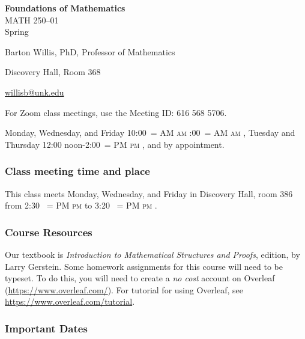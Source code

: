 \documentclass[12pt]{article}
\makeatletter
\newcounter{ex}\setcounter{ex}{0}
\renewenvironment{description}[0]{\begin{compactdesc}}{\end{compactdesc}}
\DeclareRobustCommand{\maybefakesc}[1]{%
  \ifnum\pdfstrcmp{\f@series}{\bfdefault}=\z@
    {\fontsize{\dimexpr0.8\dimexpr\f@size pt\relax}{0}\selectfont\uppercase{#1}}%
  \else
    \textsc{#1}%
  \fi
}
\newcommand\AM{\,\maybefakesc{am}\xspace}
\newcommand\PM{\,\maybefakesc{pm}\xspace}
\newcommand{\coursename}{Foundations of Mathematics}
\newcommand{\coursenumber}{MATH 250}
\newcommand{\sectionnumber}{01}
\newcommand{\term}{Spring }
\newcommand{\room}{Discovery Hall, room 386}
\newcommand{\meetingtime}{This class meets Monday, Wednesday, and Friday in \room \/  from 2:30 \PM to 3:20 \PM.}
\newcommand{\officehours}{Monday, Wednesday, and Friday 10:00\AM-11:00\AM,
    Tuesday and Thursday 12:00 noon-2:00\PM, and by appointment.}
\makeatother
\begin{document}
\cleanlookdateon%
\shortdate
\printyearoff
\large
\begin{center}
    \textbf{\coursename}  \\
    {\coursenumber--\sectionnumber} \\
     {\term \the\year} \\
\end{center}

\vskip0.25in
\normalsize


\begin{center}
\begin{description}
    \item[Instructor:] Barton Willis, PhD, Professor of Mathematics
    \item[Office:]  Discovery Hall, Room 368
    \item[\phone:]   
    \item[\Email:]    \href{mailto:willisb@unk.edu}{willisb@unk.edu}
    \item[Zoom for classes:] For Zoom class meetings, use the Meeting ID: 616 568 5706. 
    \item[Office Hours:] \officehours
  \end{description}
\end{center}

\subsubsection*{Class meeting time and place}

\meetingtime



\subsubsection*{Course Resources}

\noindent Our textbook is \emph{Introduction to Mathematical Structures and Proofs},  edition,  by  Larry Gerstein.
Some homework assignments for this course will need to be typeset. To do this, you will need to create a \emph{no cost} 
account on Overleaf (\url{https://www.overleaf.com/}).   For  tutorial for using Overleaf, see \url{https://www.overleaf.com/tutorial}.



\subsubsection*{Important Dates}
\end{document}
